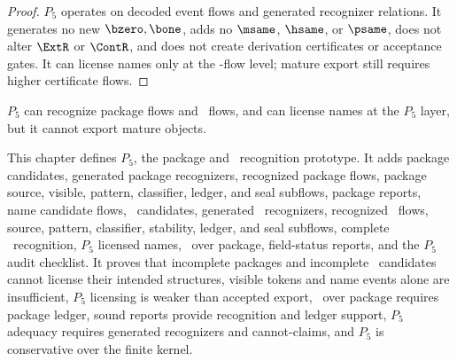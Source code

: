 \begin{proof}
$P_5$ operates on decoded event flows and generated recognizer relations. It generates no new $\bzero,\bone$, adds no $\msame$, $\hsame$, or $\psame$, does not alter $\ExtR$ or $\ContR$, and does not create derivation certificates or acceptance gates. It can license names only at the \NameCert-flow level; mature export still requires higher certificate flows.
\end{proof}

\begin{corollary}
\label{cor:pkg-namecert-p5-below-accepted-object}
$P_5$ can recognize package flows and \NameCert\ flows, and can license names at the $P_5$ layer, but it cannot export mature objects.
\end{corollary}

\begin{remark}[Summary]
\label{rem:pkg-namecert-summary}
This chapter defines $P_5$, the package and \NameCert\ recognition prototype. It adds package candidates, generated package recognizers, recognized package flows, package source, visible, pattern, classifier, ledger, and seal subflows, package reports, name candidate flows, \NameCert\ candidates, generated \NameCert\ recognizers, recognized \NameCert\ flows, source, pattern, classifier, stability, ledger, and seal subflows, complete \NameCert\ recognition, $P_5$ licensed names, \NameCert\ over package, field-status reports, and the $P_5$ audit checklist. It proves that incomplete packages and incomplete \NameCert\ candidates cannot license their intended structures, visible tokens and name events alone are insufficient, $P_5$ licensing is weaker than accepted export, \NameCert\ over package requires package ledger, sound reports provide recognition and ledger support, $P_5$ adequacy requires generated recognizers and cannot-claims, and $P_5$ is conservative over the finite kernel.
\end{remark}
